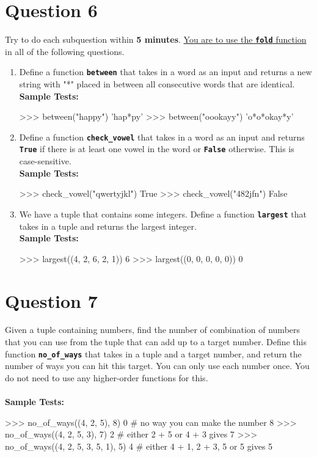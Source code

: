 \section{Question 6}
Try to do each subquestion within \textbf{5 minutes}. \underline{You are to use the \texttt{\bfseries fold}
function} in all of the following questions.
\begin{enumerate}
\item Define a function \texttt{\bfseries between} that takes in a word as an input and returns a new
string with "*" placed in between all consecutive words that are identical. \\
\textbf{Sample Tests:}
\begin{python}
>>> between("happy")
'hap*py'
>>> between("oookayy")
'o*o*okay*y'
\end{python}

\item Define a function \texttt{\bfseries check\_vowel} that takes in a word as an input and returns
\texttt{\bfseries True} if there is at least one vowel in the word or \texttt{\bfseries False} otherwise. This is
case-sensitive. \\
\newpage
\textbf{Sample Tests:}
\begin{python}
>>> check_vowel("qwertyjkl")
True
>>> check_vowel("482jfn")
False
\end{python}

\item We have a tuple that contains some integers. Define a function \texttt{\bfseries largest} that
takes in a tuple and returns the largest integer. \\
\textbf{Sample Tests:}
\begin{python}
>>> largest((4, 2, 6, 2, 1))
6
>>> largest((0, 0, 0, 0, 0))
0
\end{python}
\end{enumerate}

\section{Question 7}
Given a tuple containing numbers, find the number of combination of numbers that
you can use from the tuple that can add up to a target number. Define this function
\texttt{\bfseries no\_of\_ways} that takes in a tuple and a target number, and return the number of ways
you can hit this target. You can only use each number once. You do not need to use
any higher-order functions for this. \\ \\
\textbf{Sample Tests:}
\begin{python}
>>> no_of_ways((4, 2, 5), 8)
0                               # no way you can make the number 8
>>> no_of_ways((4, 2, 5, 3), 7)
2                               # either 2 + 5 or 4 + 3 gives 7
>>> no_of_ways((4, 2, 5, 3, 5, 1), 5)
4                               # either 4 + 1, 2 + 3, 5 or 5 gives 5
\end{python}


